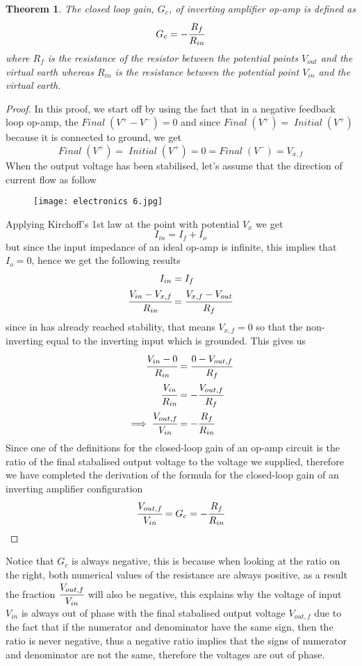 \documentclass{article}
\newtheorem{theorem}{Theorem}[subsection]
\begin{document}
 \begin{theorem}
 The closed loop gain, $G_c$, of inverting amplifier op-amp is defined as 
 $$G_c=-\cfrac{R_f}{R_{in}}$$
 where $R_f$ is the resistance of the resistor between the potential points $V_{out}$ and the virtual earth whereas $R_{in}$ is the resistance between the potential point $V_{in}$ and the virtual earth.
 \end{theorem}
 \begin{proof}
 In this proof, we start off by using the fact that in a negative feedback loop op-amp, the $Final \; (V^+-V^-)=0$ and since $Final \; (V^+)=\;Initial \; (V^+) $ because it is connected to ground, we get 
 $$Final \; (V^+)=\; Initial \; (V^+)= 0 = Final \; (V^-)=V_{x,f}$$
 When the output voltage has been stabilised, let's assume that the direction of current flow as follow
 \begin{figure}[H]
     \centering
     \texttt{[image: electronics 6.jpg]}
 \end{figure}
 Applying Kirchoff's 1st law at the point with potential $V_x$ we get 
 $$I_{in}=I_f+I_o$$
but since the input impedance of an ideal op-amp is infinite, this implies that $I_o=0$, hence we get the following results
\begin{align*}
    I_{in} &= I_f \\
    \cfrac{V_{in}-V_{x,f}}{R_{in}} &= \cfrac{V_{x,f}-V_{out}}{R_f} 
\end{align*}
 since in has already reached stability, that means $V_{x,f}=0$ so that the non-inverting equal to the inverting input which is grounded. This gives us 
 \begin{align*}
     \cfrac{V_{in}-0}{R_{in}} &= \cfrac{0-V_{out,f}}{R_f} \\
     \cfrac{V_{in}}{R_{in}} &= -\cfrac{V_{out,f}}{R_f} \\
     \implies \cfrac{V_{out,f}}{V_{in}}&=-\cfrac{R_f}{R_{in}}
 \end{align*}
 Since one of the definitions for the closed-loop gain of an op-amp circuit is the ratio of the final stabalised output voltage to the voltage we supplied, therefore we have completed the derivation of the formula for the closed-loop gain of an inverting amplifier configuration
 $$\cfrac{V_{out,f}}{V_{in}}=G_c=-\cfrac{R_f}{R_{in}}$$
 \end{proof}
 Notice that $G_c$ is always negative, this is because when looking at the ratio on the right, both numerical values of the resistance are always positive, as a result the fraction $\cfrac{V_{out,f}}{V_{in}}$ will also be negative, this explains why the voltage of input $V_{in}$ is always out of phase with the final stabalised output voltage $V_{out,f}$ due to the fact that if the numerator and denominator have the same sign, then the ratio is never negative, thus a negative ratio implies that the signs of numerator and denominator are not the same, therefore the voltages are out of phase. 
 
\end{document}

